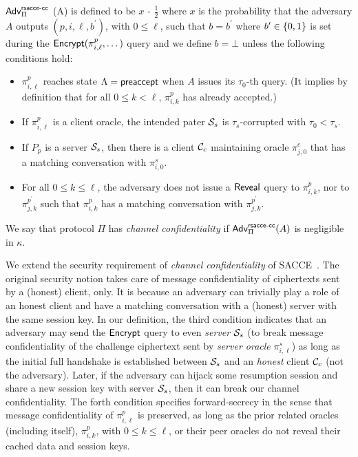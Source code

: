 \begin{definition} \label{def:rsacce-cc}
 $\mathsf{Adv}^{\mathsf{rsacce\textsc{-} cc}}_{\Pi}$ (A) is defined to be $x$ - $\frac{1}{2}$ where $x$ is the probability that the adversary $A$ outputs $(p, i, \ell, b^{\prime})$, with $0\leq \ell$,
 such that $b = b^{\prime}$ where $b^{\prime} \in \{0,1\}$ is set during the $\mathsf{Encrypt}(\pi^p_{i,\ell},\dots)$ query and we define $b=\bot$ unless the following conditions hold:
 \begin{itemize}
  \item{$\pi^p_{i,\ell}$ reaches state $\Lambda=\mathsf{preaccept}$ when $A$ issues
  its $\tau_0$-th query. (It implies by definition that for all $0\leq k < \ell$,
  $\pi^p_{i,k}$ has already accepted.)}

  \item{If $\pi^p_{i,\ell}$ is a client oracle,
  the intended pater $\mathcal{S}_s$ is $\tau_s$-corrupted with $\tau_0 < \tau_s$. }

  \item{If $P_p$ is a server $\mathcal{S}_s$, then
  there is a client $\mathcal{C}_c$ maintaining oracle $\pi^c_{j,0}$ that has a matching
  conversation with $\pi^s_{i,0}$.}

  \item{For all $0\leq k \leq \ell$, the adversary does not issue a $\mathsf{Reveal}$ query to
  $\pi^p_{i,k}$, nor to $\pi^{p^{\prime}}_{j,k}$ such that $\pi^p_{i,k}$ has a matching conversation
  with $\pi^{p^{\prime}}_{j,k}$.}

 \end{itemize}
 We say that protocol $\Pi$ has \textit{channel confidentiality}
 if $\mathsf{Adv}^{\mathsf{rsacce\textsc{-} cc}}_{\Pi}(A)$ is negligible in $\kappa$.
\end{definition}

\begin{remark}
We extend the security requirement of \textit{channel confidentiality} of SACCE~\cite{KPW13:SACCE}.
The original security notion takes care of message confidentiality of ciphertexts
sent by a (honest) client, only.  It is because an adversary can trivially play a role of an honest client and
have a matching conversation with a (honest) server with the same session key.
In our definition, the third condition indicates that an adversary may send
the $\mathsf{Encrypt}$ query to even \textit{server} $\mathcal{S}_s$
(to break message confidentiality of the challenge ciphertext sent by \textit{server oracle} $\pi^s_{i,\ell}$)
as long as the initial full handshake is established between
$\mathcal{S}_s$ and an \textit{honest} client $\mathcal{C}_c$ (not the adversary).
Later, if the adversary can hijack some resumption session and
share a new session key with server $\mathcal{S}_s$,
then it can break our channel confidentiality.
The forth condition specifies forward-secrecy in the sense that message confidentiality of $\pi^p_{i,\ell}$
is preserved, as long as the prior related oracles (including itself), $\pi^p_{i,k}$,
with $0\leq k\leq \ell$, or their peer oracles do not reveal their cached data and session keys.
\end{remark}

